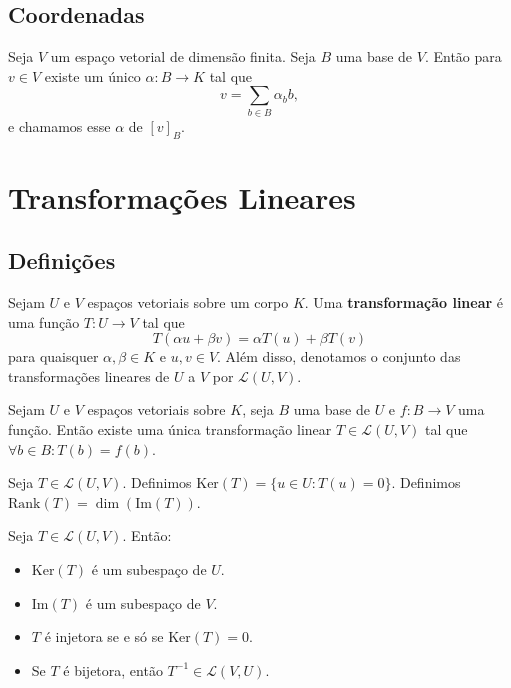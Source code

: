 \documentclass[11pt,twoside,a4paper]{book}
\begin{document}
\section{Coordenadas}

\begin{definicao}
Seja $V$ um espaço vetorial de dimensão finita. Seja $B$ uma base de $V$. Então para $v\in V$ existe um único $\alpha:B\rightarrow K$ tal que \[v=\sum\limits_{b\in B}\alpha_bb,\] e chamamos esse $\alpha$ de $[v]_B$.
\end{definicao}

\chapter{Transformações Lineares}

\section{Definições}

\begin{definicao}
Sejam \(U\) e \(V\) espaços vetoriais sobre um corpo \(K\). Uma
\textbf{transformação linear} é uma função $T:U\rightarrow V$ tal que  $$T(\alpha
u+\beta v)=\alpha T(u)+\beta T(v)$$
 para quaisquer $\alpha,\beta\in K$ e $u,v\in V$. Além disso, denotamos o conjunto das transformações lineares de $U$ a $V$ por $\mathcal{L}(U,V).$
\end{definicao}

\begin{teorema}
Sejam $U$ e $V$ espaços vetoriais sobre $K$, seja $B$ uma base de $U$ e $f:B\rightarrow V$ uma função. Então existe uma única transformação linear $T\in\mathcal{L}(U,V)$ tal que $\forall b\in B:T(b)=f(b)$.
\end{teorema}

\begin{definicao}
Seja $T\in\mathcal{L}(U,V)$. Definimos $\mathrm{Ker}(T)=\{u\in U:T(u)=0\}$. Definimos $\mathrm{Rank}(T)=\dim(\mathrm{Im}(T))$.
\end{definicao}

\begin{proposicao}
Seja $T\in\mathcal{L}(U,V)$. Então:
\begin{itemize}
\item $\mathrm{Ker}(T)$ é um subespaço de $U$.
\item $\mathrm{Im}(T)$ é um subespaço de $V$.
\item $T$ é injetora se e só se $\mathrm{Ker}(T)=0$.
\item Se $T$ é bijetora, então $T^{-1}\in\mathcal{L}(V,U)$.
\end{itemize}
\end{proposicao}
\end{document}

